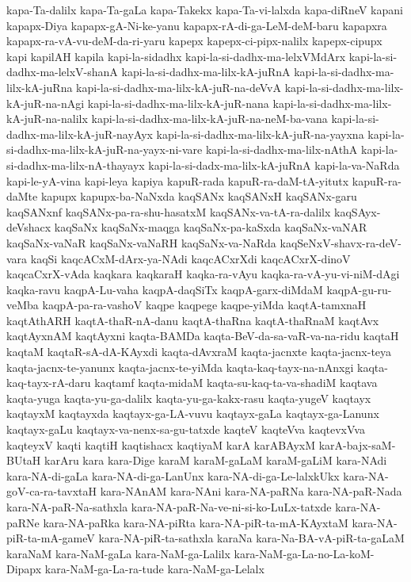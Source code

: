 {kapa-Ta-dalilx
kapa-Ta-gaLa
kapa-Takekx
kapa-Ta-vi-lalxda
kapa-diRneV
kapani
kapapx-Diya
kapapx-gA-Ni-ke-yanu
kapapx-rA-di-ga-LeM-deM-baru
kapapxra
kapapx-ra-vA-vu-deM-da-ri-yaru
kapepx
kapepx-ci-pipx-nalilx
kapepx-cipupx
kapi
kapilAH
kapila
kapi-la-sidadhx
kapi-la-si-dadhx-ma-lelxVMdArx
kapi-la-si-dadhx-ma-lelxV-shanA
kapi-la-si-dadhx-ma-lilx-kA-juRnA
kapi-la-si-dadhx-ma-lilx-kA-juRna
kapi-la-si-dadhx-ma-lilx-kA-juR-na-deVvA
kapi-la-si-dadhx-ma-lilx-kA-juR-na-nAgi
kapi-la-si-dadhx-ma-lilx-kA-juR-nana
kapi-la-si-dadhx-ma-lilx-kA-juR-na-nalilx
kapi-la-si-dadhx-ma-lilx-kA-juR-na-neM-ba-vana
kapi-la-si-dadhx-ma-lilx-kA-juR-nayAyx
kapi-la-si-dadhx-ma-lilx-kA-juR-na-yayxna
kapi-la-si-dadhx-ma-lilx-kA-juR-na-yayx-ni-vare
kapi-la-si-dadhx-ma-lilx-nAthA
kapi-la-si-dadhx-ma-lilx-nA-thayayx
kapi-la-si-dadx-ma-lilx-kA-juRnA
kapi-la-va-NaRda
kapi-le-yA-vina
kapi-leya
kapiya
kapuR-rada
kapuR-ra-daM-tA-yitutx
kapuR-ra-daMte
kapupx
kapupx-ba-NaNxda
kaqSANx
kaqSANxH
kaqSANx-garu
kaqSANxnf
kaqSANx-pa-ra-shu-hasatxM
kaqSANx-va-tA-ra-dalilx
kaqSAyx-deVshacx
kaqSaNx
kaqSaNx-maqga
kaqSaNx-pa-kaSxda
kaqSaNx-vaNAR
kaqSaNx-vaNaR
kaqSaNx-vaNaRH
kaqSaNx-va-NaRda
kaqSeNxV-shavx-ra-deV-vara
kaqSi
kaqcACxM-dArx-ya-NAdi
kaqcACxrXdi
kaqcACxrX-dinoV
kaqcaCxrX-vAda
kaqkara
kaqkaraH
kaqka-ra-vAyu
kaqka-ra-vA-yu-vi-niM-dAgi
kaqka-ravu
kaqpA-Lu-vaha
kaqpA-daqSiTx
kaqpA-garx-diMdaM
kaqpA-gu-ru-veMba
kaqpA-pa-ra-vashoV
kaqpe
kaqpege
kaqpe-yiMda
kaqtA-tamxnaH
kaqtAthARH
kaqtA-thaR-nA-danu
kaqtA-thaRna
kaqtA-thaRnaM
kaqtAvx
kaqtAyxnAM
kaqtAyxni
kaqta-BAMDa
kaqta-BeV-da-sa-vaR-va-na-ridu
kaqtaH
kaqtaM
kaqtaR-sA-dA-KAyxdi
kaqta-dAvxraM
kaqta-jacnxte
kaqta-jacnx-teya
kaqta-jacnx-te-yanunx
kaqta-jacnx-te-yiMda
kaqta-kaq-tayx-na-nAnxgi
kaqta-kaq-tayx-rA-daru
kaqtamf
kaqta-midaM
kaqta-su-kaq-ta-va-shadiM
kaqtava
kaqta-yuga
kaqta-yu-ga-dalilx
kaqta-yu-ga-kakx-rasu
kaqta-yugeV
kaqtayx
kaqtayxM
kaqtayxda
kaqtayx-ga-LA-vuvu
kaqtayx-gaLa
kaqtayx-ga-Lanunx
kaqtayx-gaLu
kaqtayx-va-nenx-sa-gu-tatxde
kaqteV
kaqteVva
kaqtevxVva
kaqteyxV
kaqti
kaqtiH
kaqtishacx
kaqtiyaM
karA
karABAyxM
karA-bajx-saM-BUtaH
karAru
kara
kara-Dige
karaM
karaM-gaLaM
karaM-gaLiM
kara-NAdi
kara-NA-di-gaLa
kara-NA-di-ga-LanUnx
kara-NA-di-ga-Le-lalxkUkx
kara-NA-goV-ca-ra-tavxtaH
kara-NAnAM
kara-NAni
kara-NA-paRNa
kara-NA-paR-Nada
kara-NA-paR-Na-sathxla
kara-NA-paR-Na-ve-ni-si-ko-LuLx-tatxde
kara-NA-paRNe
kara-NA-paRka
kara-NA-piRta
kara-NA-piR-ta-mA-KAyxtaM
kara-NA-piR-ta-mA-gameV
kara-NA-piR-ta-sathxla
karaNa
kara-Na-BA-vA-piR-ta-gaLaM
karaNaM
kara-NaM-gaLa
kara-NaM-ga-Lalilx
kara-NaM-ga-La-no-La-koM-Dipapx
kara-NaM-ga-La-ra-tude
kara-NaM-ga-Lelalx
}

